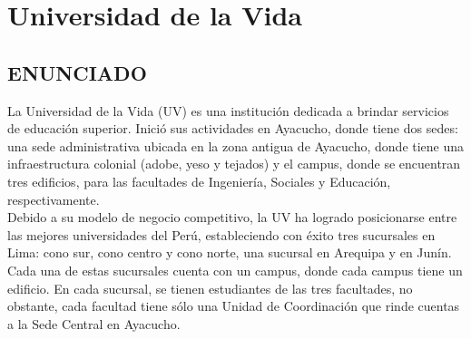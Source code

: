 \chapter{Universidad de la Vida}

\section{ENUNCIADO}
\begin{definicion}[]
{
La \“Universidad de la Vida\” (UV) es una instituci\'on dedicada a brindar
servicios de educaci\'on superior. Inici\'o sus actividades en Ayacucho,
donde tiene dos sedes: una sede administrativa ubicada en la zona antigua
de Ayacucho, donde tiene una infraestructura colonial (adobe, yeso y
tejados) y el campus, donde se encuentran tres edificios, para las
facultades de Ingenier\'ia, Sociales y Educaci\'on, respectivamente.
\\
Debido a su modelo de negocio competitivo, la UV ha logrado posicionarse
entre las mejores universidades del Per\'u, estableciendo con \'exito tres
sucursales en Lima: cono sur, cono centro y cono norte, una sucursal en
Arequipa y en Jun\'in. Cada una de estas sucursales cuenta con un campus,
donde cada campus tiene un edificio. En cada sucursal, se tienen
estudiantes de las tres facultades, no obstante, cada facultad tiene
s\'olo una Unidad de Coordinaci\'on que rinde cuentas a la Sede Central en
Ayacucho.
}
\end{definicion}

